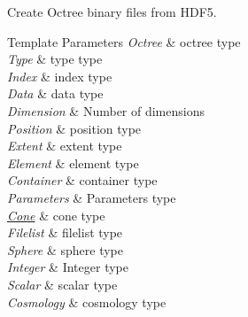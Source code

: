 Create Octree binary files from H\-D\-F5. 
\begin{DoxyTemplParams}{Template Parameters}
{\em Octree} & octree type \\
\hline
{\em Type} & type type \\
\hline
{\em Index} & index type \\
\hline
{\em Data} & data type \\
\hline
{\em Dimension} & Number of dimensions \\
\hline
{\em Position} & position type \\
\hline
{\em Extent} & extent type \\
\hline
{\em Element} & element type \\
\hline
{\em Container} & container type \\
\hline
{\em Parameters} & Parameters type \\
\hline
{\em \hyperlink{exceptionCone}{Cone}} & cone type \\
\hline
{\em Filelist} & filelist type \\
\hline
{\em Sphere} & sphere type \\
\hline
{\em Integer} & Integer type \\
\hline
{\em Scalar} & scalar type \\
\hline
{\em Cosmology} & cosmology type \\
\hline
\end{DoxyTemplParams}

